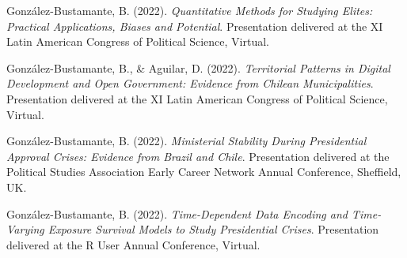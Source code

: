 \begin{publications}

\begin{benumerate}{72}



\item{\small González-Bustamante, B. (2022). {\itshape Quantitative Methods for Studying Elites: Practical Applications, Biases and Potential}. Presentation delivered at the XI Latin American Congress of Political Science, Virtual.}\vspace{1mm}

\item{\small González-Bustamante, B., \& Aguilar, D. (2022). {\itshape Territorial Patterns in Digital Development and Open Government: Evidence from Chilean Municipalities}. Presentation delivered at the XI Latin American Congress of Political Science, Virtual.}\vspace{1mm}

\item{\small González-Bustamante, B. (2022). {\itshape Ministerial Stability During Presidential Approval Crises: Evidence from Brazil and Chile}. Presentation delivered at the Political Studies Association Early Career Network Annual Conference, Sheffield, UK.}\vspace{1mm}

\item{\small González-Bustamante, B. (2022). {\itshape Time-Dependent Data Encoding and Time-Varying Exposure Survival Models to Study Presidential Crises}. Presentation delivered at the R User Annual Conference, Virtual.}\vspace{1mm}


\end{benumerate}
\end{publications}
